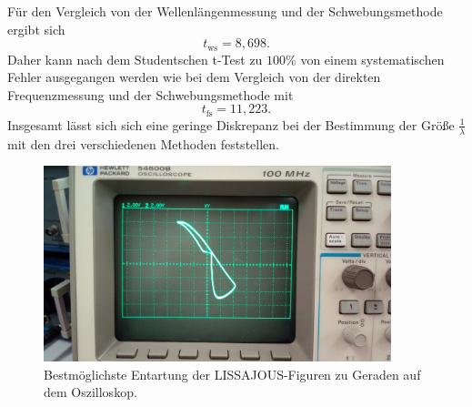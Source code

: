 Für den Vergleich von der Wellenlängenmessung und der Schwebungsmethode ergibt sich
\begin{equation*}
	t_{\mathrm{ws}} = 8,698 \mathrm{.}
\end{equation*}
Daher kann nach dem Studentschen t-Test zu $100\%$ von einem systematischen Fehler ausgegangen
werden wie bei dem Vergleich von der direkten Frequenzmessung und der Schwebungsmethode
mit
\begin{equation*}
	t_{\mathrm{fs}} = 11,223 \mathrm{.}
\end{equation*}
Insgesamt lässt sich sich eine geringe Diskrepanz bei der Bestimmung der Größe $\frac{1}{\lambda}$ mit den drei verschiedenen Methoden feststellen.
\begin{figure}
	\includegraphics[width=0.9\textwidth]{Bilder/lissajou.jpeg}
	\caption{Bestmöglichste Entartung der LISSAJOUS-Figuren zu Geraden auf dem Oszilloskop.}
	\label{fig:Lisas}
\end{figure}
